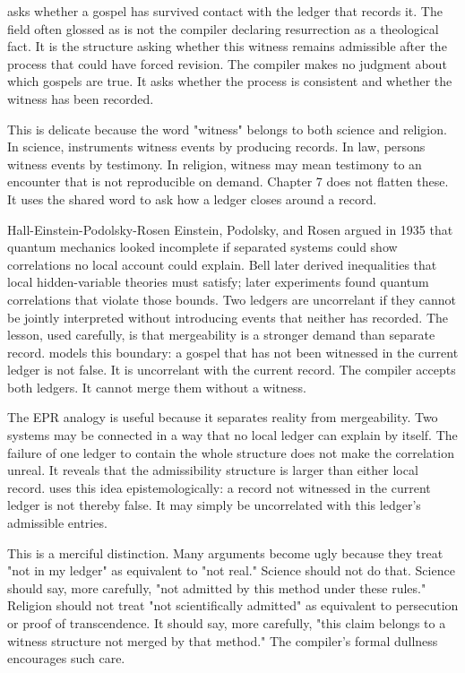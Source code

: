  asks whether a gospel has survived contact with the ledger
that records it. The field often glossed as  is not the compiler
declaring resurrection as a theological fact. It is the structure asking
whether this witness remains admissible after the process that could have
forced revision. The compiler makes no judgment about which gospels are true.
It asks whether the process is consistent and whether the witness has been
recorded.

This is delicate because the word "witness" belongs to both science and
religion. In science, instruments witness events by producing records. In law,
persons witness events by testimony. In religion, witness may mean testimony to
an encounter that is not reproducible on demand. Chapter 7 does not flatten
these. It uses the shared word to ask how a ledger closes around a record.

\begin{gphenom}{Hall-Einstein-Podolsky-Rosen}
\label{ph:hall-epr}
\GPhObs Einstein, Podolsky, and Rosen argued in 1935 that quantum mechanics
looked incomplete if separated systems could show correlations no local account
could explain. Bell later derived inequalities that local hidden-variable
theories must satisfy; later experiments found quantum correlations that violate
those bounds.
\GPhCon Two ledgers are uncorrelant if they cannot be jointly interpreted
without introducing events that neither has recorded. The lesson, used
carefully, is that mergeability is a stronger demand than separate record.
\GPhSeq {} models this boundary: a gospel that has not been
witnessed in the current ledger is not false. It is uncorrelant with the
current record. The compiler accepts both ledgers. It cannot merge them without
a witness.
\end{gphenom}

The EPR analogy is useful because it separates reality from mergeability. Two
systems may be connected in a way that no local ledger can explain by itself.
The failure of one ledger to contain the whole structure does not make the
correlation unreal. It reveals that the admissibility structure is larger than
either local record.  uses this idea epistemologically: a record
not witnessed in the current ledger is not thereby false. It may simply be
uncorrelated with this ledger's admissible entries.

This is a merciful distinction. Many arguments become ugly because they treat
"not in my ledger" as equivalent to "not real." Science should not do that.
Science should say, more carefully, "not admitted by this method under these
rules." Religion should not treat "not scientifically admitted" as equivalent
to persecution or proof of transcendence. It should say, more carefully, "this
claim belongs to a witness structure not merged by that method." The compiler's
formal dullness encourages such care.

